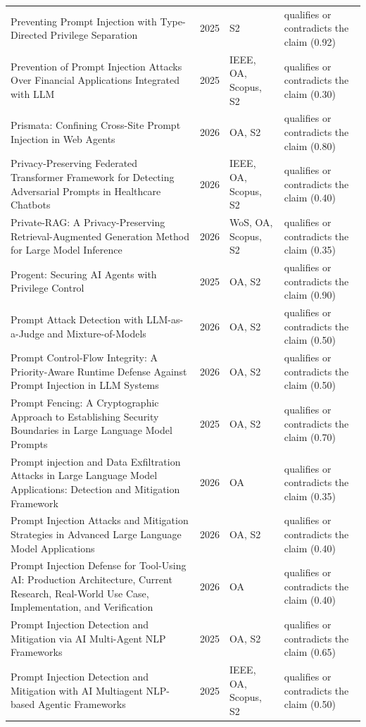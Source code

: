 \begin{longtable}{@{}%
  >{\raggedright\arraybackslash}p{}c%
  >{\raggedright\arraybackslash}p{}%
  >{\raggedright\arraybackslash}p{}@{}}
Preventing Prompt Injection with Type-Directed Privilege Separation & 2025 & S2 & qualifies or contradicts the claim (0.92) \\
Prevention of Prompt Injection Attacks Over Financial Applications Integrated with LLM & 2025 & IEEE, OA, Scopus, S2 & qualifies or contradicts the claim (0.30) \\
Prismata: Confining Cross-Site Prompt Injection in Web Agents & 2026 & OA, S2 & qualifies or contradicts the claim (0.80) \\
Privacy-Preserving Federated Transformer Framework for Detecting Adversarial Prompts in Healthcare Chatbots & 2026 & IEEE, OA, Scopus, S2 & qualifies or contradicts the claim (0.40) \\
Private-RAG: A Privacy-Preserving Retrieval-Augmented Generation Method for Large Model Inference & 2026 & WoS, OA, Scopus, S2 & qualifies or contradicts the claim (0.35) \\
Progent: Securing AI Agents with Privilege Control & 2025 & OA, S2 & qualifies or contradicts the claim (0.90) \\
Prompt Attack Detection with LLM-as-a-Judge and Mixture-of-Models & 2026 & OA, S2 & qualifies or contradicts the claim (0.50) \\
Prompt Control-Flow Integrity: A Priority-Aware Runtime Defense Against Prompt Injection in LLM Systems & 2026 & OA, S2 & qualifies or contradicts the claim (0.50) \\
Prompt Fencing: A Cryptographic Approach to Establishing Security Boundaries in Large Language Model Prompts & 2025 & OA, S2 & qualifies or contradicts the claim (0.70) \\
Prompt injection and Data Exfiltration Attacks in Large Language Model Applications: Detection and Mitigation Framework & 2026 & OA & qualifies or contradicts the claim (0.35) \\
Prompt Injection Attacks and Mitigation Strategies in Advanced Large Language Model Applications & 2026 & OA, S2 & qualifies or contradicts the claim (0.40) \\
Prompt Injection Defense for Tool-Using AI: Production Architecture, Current Research, Real-World Use Case, Implementation, and Verification & 2026 & OA & qualifies or contradicts the claim (0.40) \\
Prompt Injection Detection and Mitigation via AI Multi-Agent NLP Frameworks & 2025 & OA, S2 & qualifies or contradicts the claim (0.65) \\
Prompt Injection Detection and Mitigation with AI Multiagent NLP-based Agentic Frameworks & 2025 & IEEE, OA, Scopus, S2 & qualifies or contradicts the claim (0.50) \\

\end{longtable}
